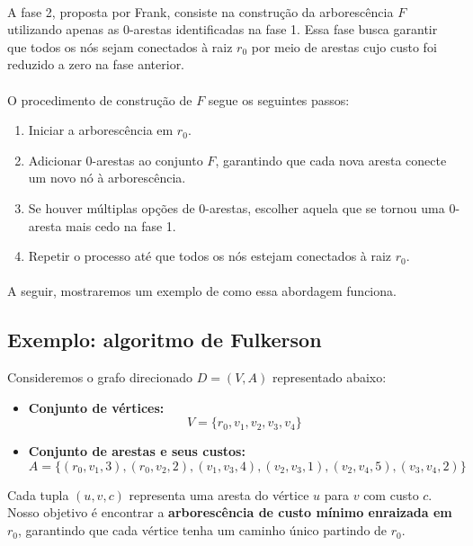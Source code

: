 \documentclass[12pt,a4paper]{article}
\begin{document}
\paragraph{}
A fase 2, proposta por Frank, consiste na construção da arborescência \( F \) utilizando apenas as 0-arestas identificadas na fase 1. Essa fase busca garantir que todos os nós sejam conectados à raiz \( r_0 \) por meio de arestas cujo custo foi reduzido a zero na fase anterior.

\paragraph{}
O procedimento de construção de \( F \) segue os seguintes passos:

\begin{enumerate}
    \item Iniciar a arborescência em \( r_0 \).
    \item Adicionar 0-arestas ao conjunto \( F \), garantindo que cada nova aresta conecte um novo nó à arborescência.
    \item Se houver múltiplas opções de 0-arestas, escolher aquela que se tornou uma 0-aresta mais cedo na fase 1.
    \item Repetir o processo até que todos os nós estejam conectados à raiz \( r_0 \).
\end{enumerate}

\paragraph{}
A seguir, mostraremos um exemplo de como essa abordagem funciona.

\subsection{Exemplo: algoritmo de Fulkerson}

Consideremos o grafo direcionado \( D = (V, A) \) representado abaixo:

\begin{itemize}
    \item \textbf{Conjunto de vértices:} 
    \[
    V = \{ r_0, v_1, v_2, v_3, v_4 \}
    \]
    \item \textbf{Conjunto de arestas e seus custos:}
    \[
    A = \{ (r_0, v_1, 3), (r_0, v_2, 2), (v_1, v_3, 4), (v_2, v_3, 1), (v_2, v_4, 5), (v_3, v_4, 2) \}
    \]
\end{itemize}

Cada tupla \( (u, v, c) \) representa uma aresta do vértice \( u \) para \( v \) com custo \( c \). Nosso objetivo é encontrar a \textbf{arborescência de custo mínimo enraizada em \( r_0 \)}, garantindo que cada vértice tenha um caminho único partindo de \( r_0 \).
\end{document}

